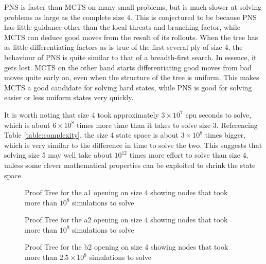 PNS is faster than MCTS on many small problems, but is much slower at solving problems as large as the complete size 4. This is conjectured to be because PNS has little guidance other than the local threats and branching factor, while MCTS can deduce good moves from the result of its rollouts. When the tree has as little differentiating factors as is true of the first several ply of size 4, the behaviour of PNS is quite similar to that of a breadth-first search. In essence, it gets lost. MCTS on the other hand starts differentiating good moves from bad moves quite early on, even when the structure of the tree is uniform. This makes MCTS a good candidate for solving hard states, while PNS is good for solving easier or less uniform states very quickly.

It is worth noting that size 4 took approximately $3 \times 10^7$ cpu seconds to solve, which is about $6 \times 10^8$ times more time than it takes to solve size 3. Referencing Table \ref{table:complexity}, the size 4 state space is about $3 \times 10^8$ times bigger, which is very similar to the difference in time to solve the two. This suggests that solving size 5 may well take about $10^{12}$ times more effort to solve than size 4, unless some clever mathematical properties can be exploited to shrink the state space. %

\begin{figure}
\centering

\caption[Proof Tree for the a1 Opening on Size 4]{Proof Tree for the a1 opening on size 4 showing nodes that took more than $10^8$ simulations to solve}
\label{fig:proof-a1}
\end{figure}

\begin{figure}
\centering

\caption[Proof Tree for the a2 Opening on Size 4]{Proof Tree for the a2 opening on size 4 showing nodes that took more than $10^9$ simulations to solve}
\label{fig:proof-a2}
\end{figure}

\begin{figure}
\centering

\caption[Proof Tree for the b2 Opening on Size 4]{Proof Tree for the b2 opening on size 4 showing nodes that took more than $2.5 \times 10^8$ simulations to solve}
\label{fig:proof-b2}
\end{figure}

